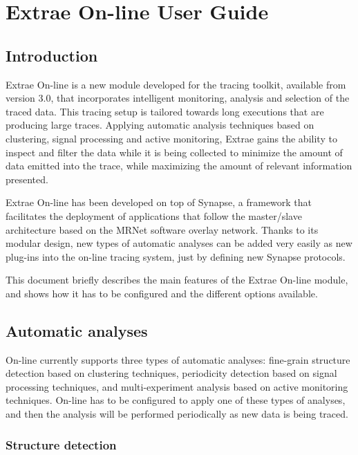 \chapter{Extrae On-line User Guide}

\section{Introduction}

Extrae On-line is a new module developed for the \TRACE tracing toolkit, available from 
version 3.0, that incorporates intelligent monitoring, analysis and selection of the traced data. This 
tracing setup is tailored towards long executions that are producing large traces. Applying automatic 
analysis techniques based on clustering, signal processing and active monitoring, Extrae gains the 
ability to inspect and filter the data while it is being collected to minimize the amount of data 
emitted into the trace, while maximizing the amount of relevant information presented. 

Extrae On-line has been developed on top of Synapse, a framework 
that facilitates the deployment of applications that follow the master/slave architecture based on the 
MRNet software overlay network. Thanks to its modular design, new types of automatic 
analyses can be added very easily as new plug-ins into the on-line tracing system, just by defining 
new Synapse protocols.

This document briefly describes the main features of the Extrae On-line module, and shows how it has 
to be configured and the different options available.


\section{Automatic analyses}

\TRACE On-line currently supports three types of automatic analyses: fine-grain structure detection 
based on clustering techniques, periodicity detection based on signal processing techniques, and 
multi-experiment analysis based on active monitoring techniques. \TRACE On-line has to be 
configured to apply one of these types of analyses, and then the analysis will be performed 
periodically as new data is being traced. 


\subsection{Structure detection}

